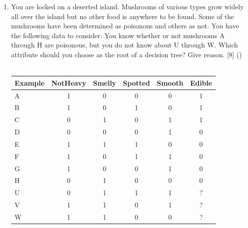\documentclass[12pt]{article}
\newcommand{\enter}{\\\textcolor{white}{1}}
\begin{document}
\begin{enumerate}[topsep=0pt, noitemsep]
      \item You are locked on a deserted island. Mushrooms of various types grow widely all over the island but no other food is anywhere to be found. Some of the mushrooms have been determined as poisonous and others as not. You have the following data to consider. You know whether or not mushrooms A through H are poisonous, but you do not know about U through W. Which attribute should you choose as the root of a decision tree? Give reason. \hfill [8] ()
        \enter
        \begin{tabular}{|l|c|c|c|c|c|}
          \hline
          Example & NotHeavy & Smelly & Spotted & Smooth & Edible \\ \hline
          A & 1 & 0 & 0 & 0 & 1 \\
          B & 1 & 0 & 1 & 0 & 1 \\
          C & 0 & 1 & 0 & 1 & 1 \\
          D & 0 & 0 & 0 & 1 & 0 \\
          E & 1 & 1 & 1 & 0 & 0 \\
          F & 1 & 0 & 1 & 1 & 0 \\
          G & 1 & 0 & 0 & 1 & 0 \\
          H & 0 & 1 & 0 & 0 & 0 \\
          U & 0 & 1 & 1 & 1 & ? \\
          V & 1 & 1 & 0 & 1 & ? \\
          W & 1 & 1 & 0 & 0 & ? \\ \hline
        \end{tabular}
    \end{enumerate}
\end{document}
